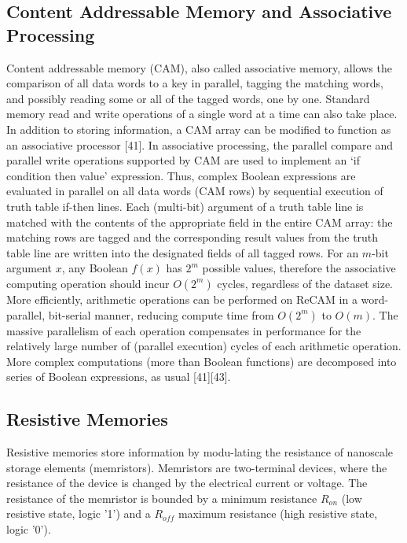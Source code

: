 \documentclass{superfri}
\begin{document}
\subsection{Content Addressable Memory and Associative Processing}
\label{sec:CAMandAP}
Content addressable memory (CAM), also called associative memory, allows the comparison of all data words to a key in parallel, tagging the matching words, and possibly reading some or all of the tagged words, one by one. Standard memory read and write operations of a single word at a time can also take place.
In addition to storing information, a CAM array can be modified to function as an associative processor \cite{foster1976content}‎[41]. In associative processing, the parallel compare and parallel write operations supported by CAM are used to implement an ‘if condition then value' expression. Thus, complex Boolean expressions are evaluated in parallel on all data words (CAM rows) by sequential execution of truth table if-then lines. Each (multi-bit) argument of a truth table line is matched with the contents of the appropriate field in the entire CAM array: the matching rows are tagged and the corresponding result values from the truth table line are written into the designated fields of all tagged rows. 
For an $m$-bit argument $x$, any Boolean $f(x)$ has $2^m$ possible values, therefore the associative computing operation should incur $O(2^m)$ cycles, regardless of the dataset size. More efficiently, arithmetic operations can be performed on ReCAM in a word-parallel, bit-serial manner, reducing compute time from $O(2^m)$ to $O(m)$. The massive parallelism of each operation compensates in performance for the relatively large number of (parallel execution) cycles of each arithmetic operation.
More complex computations (more than Boolean functions) are decomposed into series of Boolean expressions, as usual [41][43]. 

\subsection{Resistive Memories}
\label{sec:resistive_memories}
Resistive memories store information by modu-lating the resistance of nanoscale storage elements (memristors). Memristors are two-terminal devices, where the resistance of the device is changed by the electrical current or voltage. The resistance of the memristor is bounded by a minimum resistance $R_{on}$ (low resistive state, logic '1') and a $R_{off}$ maximum resistance (high resistive state, logic '0').
\end{document}
